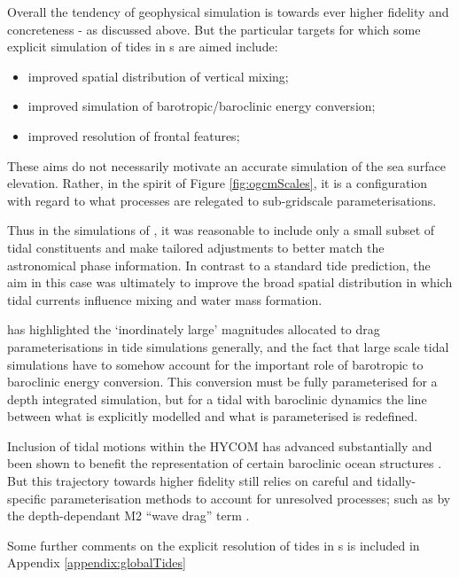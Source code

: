 Overall the tendency of geophysical simulation is towards ever higher fidelity and concreteness - as discussed above. But the particular targets for which some explicit simulation of tides in \OGCM{}s are aimed include:
\begin{itemize}
    \item improved spatial distribution of vertical mixing;
    \item improved simulation of barotropic/baroclinic energy conversion;
    \item improved resolution of frontal features;
\end{itemize}
These aims do not necessarily motivate an accurate simulation of the sea surface elevation.
Rather, in the spirit of Figure \ref{fig:ogcmScales}, it is a configuration with regard to what processes are relegated to sub-gridscale parameterisations.

Thus in the \OFAM{} simulations of \citep{Schiller:2004fv},  it was reasonable to include only a small subset of tidal constituents and make tailored adjustments to better match the astronomical phase information.  In contrast to a standard tide prediction,  the aim in this case was ultimately to improve the broad spatial distribution in which tidal currents influence mixing and water mass formation.

\citep{Arbic:2004wz} has highlighted the `inordinately large' magnitudes allocated to drag parameterisations in tide simulations generally, and the fact that large scale tidal simulations have to somehow account for the important role of barotropic to baroclinic energy conversion.   This conversion must be fully parameterised for a depth integrated simulation, but for a tidal \OGCM{} with baroclinic dynamics the line between what is explicitly modelled and what is parameterised is redefined.  

Inclusion of tidal motions within the HYCOM \OGCM{} has advanced substantially and been shown to benefit the representation of certain baroclinic ocean structures  \citep{10.1016/j.ocemod.2019.02.008}.    But this trajectory towards higher fidelity still relies on careful and tidally-specific parameterisation methods to account for unresolved processes; such as by the depth-dependant M2 ``wave drag'' term \citep{Jayne:2001tr}.

Some further comments on the explicit resolution of tides in \OGCM{}s is included in Appendix \ref{appendix:globalTides}



